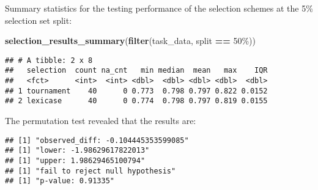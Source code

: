 \documentclass[
]{book}
\newenvironment{Shaded}{\begin{snugshade}}{\end{snugshade}}
\newcommand{\AttributeTok}[1]{\textcolor[rgb]{0.13,0.29,0.53}{#1}}
\newcommand{\DecValTok}[1]{\textcolor[rgb]{0.00,0.00,0.81}{#1}}
\newcommand{\FunctionTok}[1]{\textcolor[rgb]{0.13,0.29,0.53}{\textbf{#1}}}
\newcommand{\NormalTok}[1]{#1}
\newcommand{\OtherTok}[1]{\textcolor[rgb]{0.56,0.35,0.01}{#1}}
\newcommand{\SpecialCharTok}[1]{\textcolor[rgb]{0.81,0.36,0.00}{\textbf{#1}}}
\newcommand{\StringTok}[1]{\textcolor[rgb]{0.31,0.60,0.02}{#1}}
\begin{document}
Summary statistics for the testing performance of the selection schemes at the 5\% selection set split:

\begin{Shaded}
\begin{Highlighting}[]
\FunctionTok{selection\_results\_summary}\NormalTok{(}\FunctionTok{filter}\NormalTok{(task\_data, split }\SpecialCharTok{==} \StringTok{\textquotesingle{}50\%\textquotesingle{}}\NormalTok{))}
\end{Highlighting}
\end{Shaded}

\begin{verbatim}
## # A tibble: 2 x 8
##   selection  count na_cnt   min median  mean   max    IQR
##   <fct>      <int>  <int> <dbl>  <dbl> <dbl> <dbl>  <dbl>
## 1 tournament    40      0 0.773  0.798 0.797 0.822 0.0152
## 2 lexicase      40      0 0.774  0.798 0.797 0.819 0.0155
\end{verbatim}

The permutation test revealed that the results are:

\begin{Shaded}
\end{Shaded}

\begin{verbatim}
## [1] "observed_diff: -0.104445353599085"
## [1] "lower: -1.98629617822013"
## [1] "upper: 1.98629465100794"
## [1] "fail to reject null hypothesis"
## [1] "p-value: 0.91335"
\end{verbatim}
\end{document}
